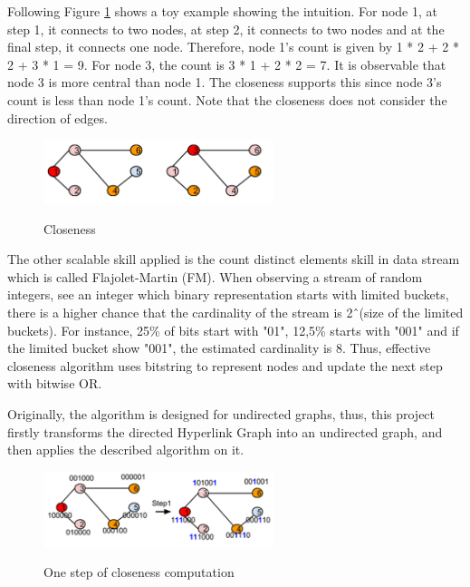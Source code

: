 Following Figure \ref{fig3} shows a toy example showing the intuition. For node 1, at step 1, it connects to two nodes, at step 2, it connects to two nodes and at the final step, it  connects one node. Therefore, node 1’s count is given by 1 * 2 + 2 * 2 + 3 * 1 = 9. For node 3, the count is 3 * 1 + 2 * 2 = 7. It is observable that node 3 is more central than node 1. The closeness supports this since node 3’s count is less than node 1’s count. Note that the closeness does not consider the direction of edges.

\begin{figure}[H]
	\begin{center}
		\label{fig3}		
		\includegraphics[width=0.6\textwidth]{fig3}	
		\caption{Closeness}	
	\end{center}
\end{figure}

The other scalable skill applied is the count distinct elements skill in data stream which is called Flajolet-Martin (FM).  When observing a stream of random integers, see an integer which binary representation starts with limited buckets, there is a higher chance that the cardinality of the stream is 2\^\ (size of the limited buckets). For instance, 25\% of bits start with "01", 12,5\% starts with "001" and if the limited bucket show "001", the estimated cardinality is 8. Thus, effective closeness algorithm uses bitstring to represent nodes and update the next step with bitwise OR. 

Originally, the algorithm is designed for undirected graphs, thus, this project firstly transforms the directed Hyperlink Graph into an undirected graph, and then applies the described algorithm on it.

\begin{figure}[H]
	\begin{center}
		\label{fig4}		
		\includegraphics[width=0.6\textwidth]{fig4}	
		\caption{One step of closeness computation}	
	\end{center}
\end{figure}

